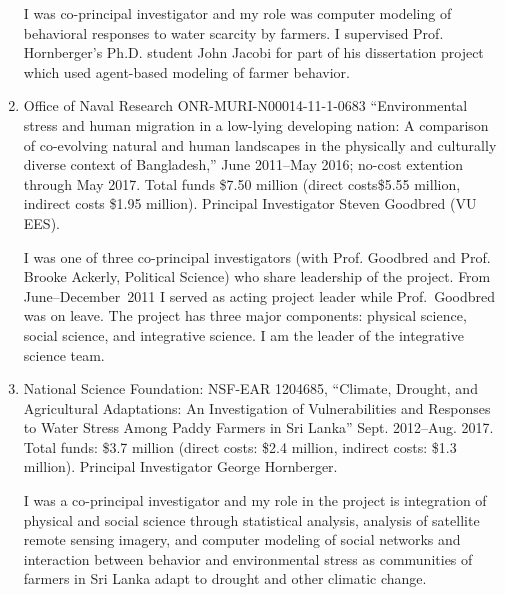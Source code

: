 \begin{enumerate}
\begin{credit}
I was co-principal investigator and my role was computer modeling of behavioral responses to water scarcity by farmers. I supervised Prof. Hornberger's Ph.D. student John Jacobi for part of his dissertation project which used agent-based modeling of farmer behavior.
\end{credit}
%
%
\item Office of Naval Research ONR-MURI-N00014-11-1-0683 ``Environmental stress and human migration in a low-lying developing nation: A comparison of co-evolving natural and human landscapes in the physically and culturally diverse context of Bangladesh,'' June 2011--May 2016; no-cost extention through May 2017. Total funds \$7.50 million (direct costs\$5.55 million, indirect costs \$1.95 million). Principal Investigator Steven Goodbred (VU EES).
\begin{credit}
I was one of three co-principal investigators (with Prof. Goodbred and Prof. Brooke Ackerly, Political Science) who share leadership of the project. From June--December~2011 I served as acting project leader while Prof.~Goodbred was on leave. The project has three major components: physical science, social science, and integrative science. I am the leader of the integrative science team.
\end{credit}
%
%
\item National Science Foundation: NSF-EAR 1204685, ``Climate, Drought, and Agricultural Adaptations: An Investigation of Vulnerabilities and Responses to Water Stress Among Paddy Farmers in Sri Lanka'' Sept. 2012--Aug. 2017. Total funds: \$3.7 million (direct costs: \$2.4 million, indirect costs: \$1.3 million). Principal Investigator George Hornberger.
\begin{credit}
I was a co-principal investigator and my role in the project is integration of physical and social science through statistical analysis, analysis of satellite remote sensing imagery, and computer modeling of social networks and interaction between behavior and environmental stress as communities of farmers in Sri Lanka adapt to drought and other climatic change.
\end{credit}
\end{enumerate}
\iffalse
\subsubsection{Under Review}
\begin{enumerate}
  \iffalse
  \fi

\end{enumerate}%
\fi
